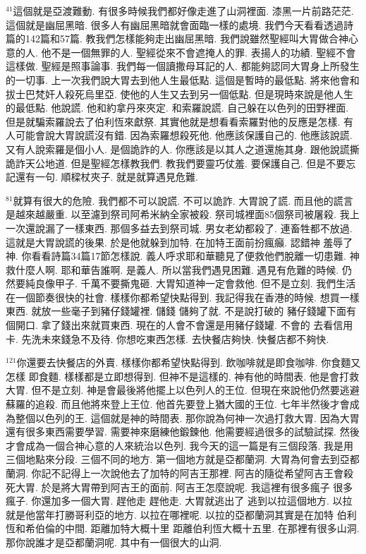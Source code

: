 \documentclass{book}
\begin{document}
$^{41}$這個就是亞渡難動.
有很多時候我們都好像走進了山洞裡面.
漆黑一片前路茫茫.
這個就是幽屈黑暗.
很多人有幽屈黑暗就會面臨一樣的處境.
我們今天看看透過詩篇的142篇和57篇.
教我們怎樣能夠走出幽屈黑暗.
我們說雖然聖經叫大胃做合神心意的人.
他不是一個無罪的人.
聖經從來不會遮掩人的罪.
表揚人的功績.
聖經不會這樣做.
聖經是照事論事.
我們每一個讀撒母耳記的人.
都能夠認同大胃身上所發生的一切事.
上一次我們說大胃去到他人生最低點.
這個是暫時的最低點.
將來他會和拔士巴梵奸人殺死烏里亞.
使他的人生又去到另一個低點.
但是現時來說是他人生的最低點.
他說謊.
他和約拿丹來夾定.
和索羅說謊.
自己躲在以色列的田野裡面.
但是就騙索羅說去了伯利恆來獻祭.
其實他就是想看看索羅對他的反應是怎樣.
有人可能會說大胃說謊沒有錯.
因為索羅想殺死他.
他應該保護自己的.
他應該說謊.
又有人說索羅是個小人.
是個詭詐的人.
你應該是以其人之道還施其身.
跟他說謊撕詭詐天公地道.
但是聖經怎樣教我們.
教我們要靈巧仗羞.
要保護自己.
但是不要忘記還有一句.
順樑杖夾子.
就是就算遇見危難.

$^{81}$就算有很大的危險.
我們都不可以說謊.
不可以詭詐.
大胃說了謊.
而且他的謊言是越來越嚴重.
以至濾到祭司阿希米納全家被殺.
祭司城裡面85個祭司被屠殺.
我上一次還說漏了一樣東西.
那個多益去到祭司城.
男女老幼都殺了.
連畜牲都不放過.
這就是大胃說謊的後果.
於是他就躲到加特.
在加特王面前扮瘋癲.
認錯神 羞辱了神.
你看看詩篇34篇17節怎樣說.
義人呼求耶和華聽見了便救他們脫離一切患難.
神救什麼人啊.
耶和華告誰啊.
是義人.
所以當我們遇見困難.
遇見有危難的時候.
仍然要純良像甲子.
千萬不要撕鬼砸.
大胃知道神一定會救他.
但不是立刻.
我們生活在一個節奏很快的社會.
樣樣你都希望快點得到.
我記得我在香港的時候.
想買一樣東西.
就放一些毫子到豬仔錢罐裡.
儲錢 儲夠了就.
不是說打破的 豬仔錢罐下面有個開口.
拿了錢出來就買東西.
現在的人會不會還是用豬仔錢罐.
不會的 去看信用卡.
先洗未來錢急不及待.
你想吃東西怎樣.
去快餐店夠快.
快餐店都不夠快.

$^{121}$你還要去快餐店的外賣.
樣樣你都希望快點得到.
飲咖啡就是即食咖啡.
你食麵又怎樣 即食麵.
樣樣都是立即想得到.
但神不是這樣的.
神有他的時間表.
他是會打救大胃.
但不是立刻.
神是會最後將他擺上以色列人的王位.
但現在來說他仍然要逃避蘇羅的追殺.
而且他將來登上王位.
他首先要登上猶大國的王位.
七年半然後才會成為整個以色列的王.
這個就是神的時間表.
那你說為何神一次過打救大胃.
因為大胃還有很多東西需要學習.
需要神來磨練他鍛鍊他.
他需要經過很多的試驗試探.
然後才會成為一個合神心意的人來統治以色列.
我今天的這一篇是有三個段落.
我是用三個地點來分段.
三個不同的地方.
第一個地方就是亞都蘭洞.
大胃為何會去到亞都蘭洞.
你記不記得上一次說他去了加特的阿吉王那裡.
阿吉的隨從希望阿吉王會殺死大胃.
於是將大胃帶到阿吉王的面前.
阿吉王怎麼說呢.
我這裡有很多瘋子 很多瘋子.
你還加多一個大胃.
趕他走 趕他走.
大胃就逃出了 逃到以拉這個地方.
以拉就是他當年打勝哥利亞的地方.
以拉在哪裡呢.
以拉的亞都蘭洞其實是在加特 伯利恆和希伯倫的中間.
距離加特大概十里 距離伯利恆大概十五里.
在那裡有很多山洞.
那你說誰才是亞都蘭洞呢.
其中有一個很大的山洞.
\end{document}
